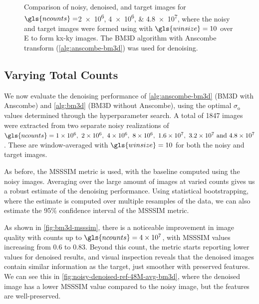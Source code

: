 \begin{figure}
    \caption{Comparison of noisy, denoised, and target images for $\gls{ncounts}=$\numlist{2e6;4e6;4.8e7}, where the noisy and target images were formed using with $\gls{winsize}=\num{10}$ over \gls{E} to form \gls{kx}-\gls{ky} images. The \gls{BM3D} algorithm with Anscombe transform (\cref{alg:anscombe-bm3d}) was used for denoising.}
    \label{fig:combined-noisy-denoised}
\end{figure}

\subsection{Varying Total Counts}
We now evaluate the denoising performance of \cref{alg:anscombe-bm3d} (\gls{BM3D} with Anscombe) and \cref{alg:bm3d} (\gls{BM3D} without Anscombe), using the optimal $\sigma_{\text{o}}$ values determined through the hyperparameter search. A total of \num{1847} images were extracted from two separate noisy realizations of $\gls{ncounts}=\numlist{1e6;2e6;4e6;8e6;1.6e7;3.2e7;4.8e7}$. These are window-averaged with $\gls{winsize}=10$ for both the noisy and target images. 

As before, the \gls{MSSSIM} metric is used, with the baseline computed using the noisy images. Averaging over the large amount of images at varied counts gives us a robust estimate of the denoising performance. Using statistical bootstrapping, where the estimate is computed over multiple resamples of the data, we can also estimate the \num{95}\% confidence interval of the \gls{MSSSIM} metric.

As shown in \cref{fig:bm3d-msssim}, there is a noticeable improvement in image quality with counts up to $\gls{ncounts}=\num{4e7}$, with \gls{MSSSIM} values increasing from \num{0.6} to \num{0.83}. Beyond this count, the metric starts reporting lower values for denoised results, and visual inspection reveals that the denoised images contain similar information as the target, just smoother with preserved features. We can see this in \cref{fig:noisy-denoised-ref-48M-avg-bm3d}, where the denoised image has a lower \gls{MSSSIM} value compared to the noisy image, but the features are well-preserved.

